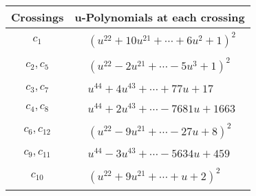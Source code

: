 \documentclass[1p]{elsarticle_modified}
\theoremstyle{definition}
\begin{document}
\begin{tabular}{m{50pt}|m{274pt}}
Crossings & \hspace{64pt}u-Polynomials at each crossing \\
\hline $$\begin{aligned}c_{1}\end{aligned}$$&$\begin{aligned}
&(u^{22}+10 u^{21}+\cdots+6 u^2+1)^{2}
\end{aligned}$\\
\hline $$\begin{aligned}c_{2},c_{5}\end{aligned}$$&$\begin{aligned}
&(u^{22}-2 u^{21}+\cdots-5 u^3+1)^{2}
\end{aligned}$\\
\hline $$\begin{aligned}c_{3},c_{7}\end{aligned}$$&$\begin{aligned}
&u^{44}+4 u^{43}+\cdots+77 u+17
\end{aligned}$\\
\hline $$\begin{aligned}c_{4},c_{8}\end{aligned}$$&$\begin{aligned}
&u^{44}+2 u^{43}+\cdots-7681 u+1663
\end{aligned}$\\
\hline $$\begin{aligned}c_{6},c_{12}\end{aligned}$$&$\begin{aligned}
&(u^{22}-9 u^{21}+\cdots-27 u+8)^{2}
\end{aligned}$\\
\hline $$\begin{aligned}c_{9},c_{11}\end{aligned}$$&$\begin{aligned}
&u^{44}-3 u^{43}+\cdots-5634 u+459
\end{aligned}$\\
\hline $$\begin{aligned}c_{10}\end{aligned}$$&$\begin{aligned}
&(u^{22}+9 u^{21}+\cdots+u+2)^{2}
\end{aligned}$\\
\hline
\end{tabular}\\~\\
\newpage\renewcommand{\arraystretch}{1}
\end{document}
